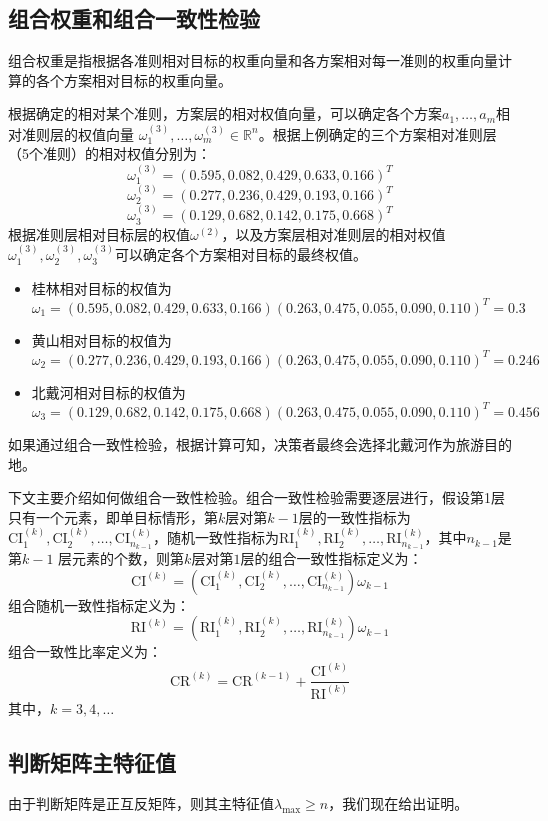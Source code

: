 \subsection{组合权重和组合一致性检验}
组合权重是指根据各准则相对目标的权重向量和各方案相对每一准则的权重向量计算的各个方案相对目标的权重向量。

根据确定的相对某个准则，方案层的相对权值向量，可以确定各个方案$a_1,\ldots,a_m$相对准则层的权值向量
$\omega_1^{(3)},\ldots,\omega_m^{(3)}\in \mathbb{R}^n$。根据上例确定的三个方案相对准则层（5个准则）的相对权值分别为：
\[\omega_1^{(3)}=(0.595,0.082,0.429,0.633,0.166)^T\]
\[\omega_2^{(3)}=(0.277,0.236,0.429,0.193,0.166)^T\]
\[\omega_3^{(3)}=(0.129,0.682,0.142,0.175,0.668)^T\]
根据准则层相对目标层的权值$\omega^{(2)}$，以及方案层相对准则层的相对权值$\omega_1^{(3)},\omega_2^{(3)},\omega_3^{(3)}$可以确定各个方案相对目标的最终权值。
\begin{itemize}
\item 桂林相对目标的权值为
\[\omega_1 = (0.595,0.082,0.429,0.633,0.166)(0.263,0.475,0.055,0.090,0.110)^T=0.3\]
\item 黄山相对目标的权值为
\[\omega_2 = (0.277,0.236,0.429,0.193,0.166)(0.263,0.475,0.055,0.090,0.110)^T=0.246\]
\item 北戴河相对目标的权值为
\[\omega_3 = (0.129,0.682,0.142,0.175,0.668)(0.263,0.475,0.055,0.090,0.110)^T=0.456\]
\end{itemize}
如果通过组合一致性检验，根据计算可知，决策者最终会选择北戴河作为旅游目的地。

下文主要介绍如何做组合一致性检验。组合一致性检验需要逐层进行，假设第1层只有一个元素，即单目标情形，第$k$层对第$k-1$层的一致性指标为$\mathrm{CI}_1^{(k)},\mathrm{CI}_2^{(k)},\ldots,\mathrm{CI}_{n_{k-1}}^{(k)}$，随机一致性指标为$\mathrm{RI}_1^{(k)},\mathrm{RI}_2^{(k)},\ldots,\mathrm{RI}_{n_{k-1}}^{(k)}$，其中$n_{k-1}$是第$k-1$ 层元素的个数，则第$k$层对第$1$层的组合一致性指标定义为：
\[\mathrm{CI}^{(k)} = (\mathrm{CI}_1^{(k)},\mathrm{CI}_2^{(k)},\ldots,\mathrm{CI}_{n_{k-1}}^{(k)})\omega_{k-1}\]
组合随机一致性指标定义为：
\[\mathrm{RI}^{(k)} = (\mathrm{RI}_1^{(k)},\mathrm{RI}_2^{(k)},\ldots,\mathrm{RI}_{n_{k-1}}^{(k)})\omega_{k-1}\]
组合一致性比率定义为：
\[\mathrm{CR}^{(k)} = \mathrm{CR}^{(k-1)} + \frac{\mathrm{CI}^{(k)}}{\mathrm{RI}^{(k)}}\]
其中，$k=3,4,\ldots$

\subsection{判断矩阵主特征值}
由于判断矩阵是正互反矩阵，则其主特征值$\lambda_{\max}\ge n$，我们现在给出证明\cite{xu1988ahp}。

